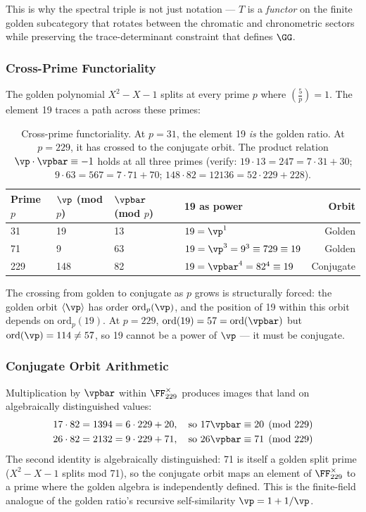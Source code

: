 This is why the spectral triple is not just notation --- $T$ is a \emph{functor} on the finite golden subcategory that rotates between the chromatic and chronometric sectors while preserving the trace-determinant constraint that defines $\GG$.

\subsubsection*{Cross-Prime Functoriality}

The golden polynomial $X^2 - X - 1$ splits at every prime $p$ where $\left(\frac{5}{p}\right) = 1$. The element 19 traces a path across these primes:

\begin{table}[!ht]
\centering\small
\begin{tabular}{@{}llllr@{}}
\toprule
\textbf{Prime $p$} & \textbf{$\vp$ (mod $p$)} & \textbf{$\vpbar$ (mod $p$)} & \textbf{19 as power} & \textbf{Orbit} \\
\midrule
31  & 19 & 13 & $19 = \vp^1$ & Golden \\
71  & 9  & 63 & $19 = \vp^3 = 9^3 \equiv 729 \equiv 19$ & Golden \\
229 & 148 & 82 & $19 = \vpbar^4 = 82^4 \equiv 19$ & Conjugate \\
\bottomrule
\end{tabular}
\caption{Cross-prime functoriality. At $p = 31$, the element 19 \emph{is} the golden ratio. At $p = 229$, it has crossed to the conjugate orbit. The product relation $\vp \cdot \vpbar \equiv -1$ holds at all three primes (verify: $19 \cdot 13 = 247 = 7 \cdot 31 + 30$; $9 \cdot 63 = 567 = 7 \cdot 71 + 70$; $148 \cdot 82 = 12136 = 52 \cdot 229 + 228$).}
\end{table}

The crossing from golden to conjugate as $p$ grows is structurally forced: the golden orbit $\langle\vp\rangle$ has order $\mathrm{ord}_p(\vp)$, and the position of 19 within this orbit depends on $\mathrm{ord}_p(19)$. At $p = 229$, $\mathrm{ord}(19) = 57 = \mathrm{ord}(\vpbar)$ but $\mathrm{ord}(\vp) = 114 \neq 57$, so 19 cannot be a power of $\vp$ --- it must be conjugate.

\subsubsection*{Conjugate Orbit Arithmetic}

Multiplication by $\vpbar$ within $\FF_{229}^\times$ produces images that land on algebraically distinguished values:
\begin{align}
17 \cdot 82 &= 1394 = 6 \cdot 229 + 20, \quad\text{so } 17\vpbar \equiv 20 \pmod{229} \\
26 \cdot 82 &= 2132 = 9 \cdot 229 + 71, \quad\text{so } 26\vpbar \equiv 71 \pmod{229}
\end{align}
The second identity is algebraically distinguished: 71 is itself a golden split prime ($X^2 - X - 1$ splits mod 71), so the conjugate orbit maps an element of $\FF_{229}^\times$ to a prime where the golden algebra is independently defined. This is the finite-field analogue of the golden ratio's recursive self-similarity $\vp = 1 + 1/\vp$.

